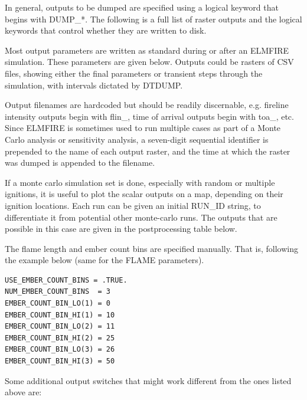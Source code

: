 In general, outputs to be dumped are specified using a logical keyword that begins with DUMP\_*. The following is a full list of raster outputs and the logical keywords that control whether they are written to disk. 

Most output parameters are written as standard during or after an ELMFIRE simulation. These parameters are given below. Outputs could be rasters of CSV files, showing either the final parameters or transient steps through the simulation, with intervals dictated by DTDUMP.



Output filenames are hardcoded but should be readily discernable, e.g. fireline intensity outputs begin with flin\_, time of arrival outputs begin with toa\_, etc. Since ELMFIRE is sometimes used to run multiple cases as part of a Monte Carlo analysis or sensitivity analysis, a seven-digit sequential identifier is prepended to the name of each output raster, and the time at which the raster was dumped is appended to the filename.

If a monte carlo simulation set is done, especially with random or multiple ignitions, it is useful to plot the scalar outputs on a map, depending on their ignition locations. Each run can be given an initial RUN\_ID string, to differentiate it from potential other monte-carlo runs. The outputs that are possible in this case are given in the postprocessing table below.



The flame length and ember count bins are specified manually. That is, following the example below (same for the FLAME parameters).

\begin{verbatim}
USE_EMBER_COUNT_BINS = .TRUE.
NUM_EMBER_COUNT_BINS  = 3
EMBER_COUNT_BIN_LO(1) = 0
EMBER_COUNT_BIN_HI(1) = 10
EMBER_COUNT_BIN_LO(2) = 11
EMBER_COUNT_BIN_HI(2) = 25
EMBER_COUNT_BIN_LO(3) = 26
EMBER_COUNT_BIN_HI(3) = 50

\end{verbatim}

Some additional output switches that might work different from the ones listed above are:

